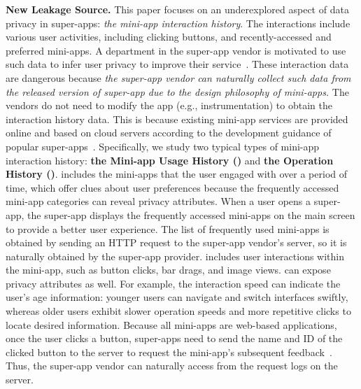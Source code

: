 \noindent\textbf{New Leakage Source.}
This paper focuses on an underexplored aspect of data privacy in super-apps: \textit{the mini-app interaction history}. The interactions include various user activities, including clicking buttons, and recently-accessed and preferred mini-apps. A department in the super-app vendor is motivated to use such data to infer user privacy to improve their service~\cite{wu2022linkteller}.
These interaction data are dangerous because \textit{the super-app vendor can naturally collect such data from the released version of super-app due to the design philosophy of mini-apps.} The vendors do not need to modify the app (e.g., instrumentation) to obtain the interaction history data. This is because existing mini-app services are provided online and based on cloud servers according to the development guidance of popular super-apps~\cite{alipaysdk,wechatsdk,tiktoksdk}. 
% 
Specifically, we study two typical types of mini-app interaction history: \textbf{the Mini-app Usage History (\mini)} and \textbf{the Operation History (\op)}. 
% 
\textbf{\mini} includes the mini-apps that the user engaged with over a period of time, which offer clues about user preferences because the frequently accessed mini-app categories can reveal privacy attributes. 
When a user opens a super-app, the super-app displays the frequently accessed mini-apps on the main screen to provide a better user experience. The list of frequently used mini-apps is obtained by sending an HTTP request to the super-app vendor's server, so it is naturally obtained by the super-app provider.
% 
\textbf{\op} includes user interactions within the mini-app, such as button clicks, bar drags, and image views. \op can expose privacy attributes as well. For example, the interaction speed can indicate the user's age information: younger users can navigate and switch interfaces swiftly, whereas older users exhibit slower operation speeds and more repetitive clicks to locate desired information.
Because all mini-apps are web-based applications, once the user clicks a button, super-apps need to send the name and ID of the clicked button to the server to request the mini-app's subsequent feedback~\cite{10.1145/3607199.3607236}. Thus, the super-app vendor can naturally access \op from the request logs on the server.



